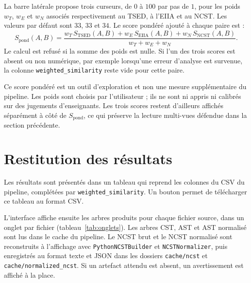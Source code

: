\documentclass[12pt,a4paper,oneside]{report}
\begin{document}
La barre latérale propose trois curseurs, de $0$ à $100$ par pas de $1$, pour
les poids $w_T$, $w_E$ et $w_N$ associés respectivement au TSED, à l'EIIA et au
NCST. Les valeurs par défaut sont $33$, $33$ et $34$. Le score pondéré ajouté
à chaque paire est :
\begin{equation}
S_{\mathrm{pond}}(A,B) = \frac{w_T\, S_{\mathrm{TSED}}(A,B) + w_E\,
S_{\mathrm{EIIA}}(A,B) + w_N\, S_{\mathrm{NCST}}(A,B)}{w_T + w_E + w_N}.
\end{equation}
Le calcul est refusé si la somme des poids est nulle. Si l'un des trois scores
est absent ou non numérique, par exemple lorsqu'une erreur d'analyse est
survenue, la colonne \texttt{weighted\_similarity} reste vide pour cette paire.

Ce score pondéré est un outil d'exploration et non une mesure supplémentaire
du pipeline. Les poids sont choisis par l'utilisateur ; ils ne sont ni appris
ni calibrés sur des jugements d'enseignants. Les trois scores restent
d'ailleurs affichés séparément à côté de $S_{\mathrm{pond}}$, ce qui préserve
la lecture multi-vues défendue dans la section précédente.

\section{Restitution des résultats}

Les résultats sont présentés dans un tableau qui reprend les colonnes du CSV du
pipeline, complétées par \texttt{weighted\_similarity}. Un bouton permet de
télécharger ce tableau au format CSV.

L'interface affiche ensuite les arbres produits pour chaque fichier source,
dans un onglet par fichier (tableau~\ref{tab:onglets}). Les arbres CST, AST et
AST normalisé sont lus dans le cache du pipeline. Le NCST brut et le NCST
normalisé sont reconstruits à l'affichage avec \texttt{PythonNCSTBuilder} et
\texttt{NCSTNormalizer}, puis enregistrés au format texte et JSON dans les
dossiers \texttt{cache/ncst} et \texttt{cache/normalized\_ncst}. Si un artefact
attendu est absent, un avertissement est affiché à la place.
\end{document}
